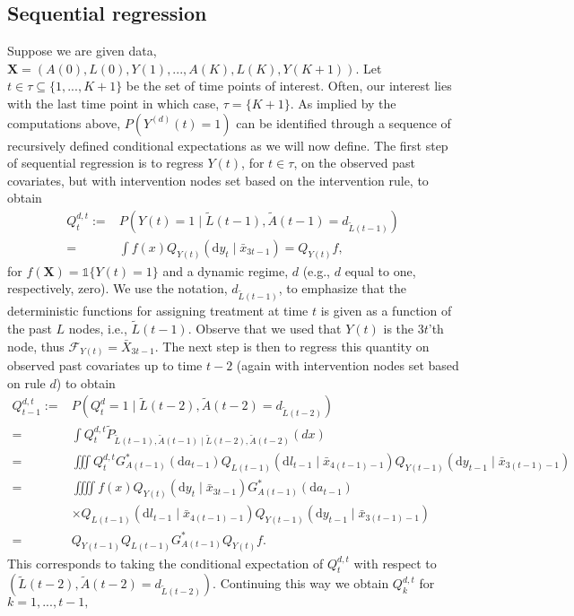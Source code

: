 \documentclass{article}
\newcommand{\A}[1]{A(#1)}
\renewcommand{\L}[1]{L(#1)}
\newcommand{\Y}[1]{Y(#1)}
\newcommand{\Ystar}[2]{Y^{(#1)}(#2)}
\newcommand{\Lbar}[1]{\tilde{L}(#1)}
\newcommand{\Abar}[1]{\tilde{A}(#1)}
\renewcommand{\d}{\ensuremath{\mathrm{d}}}
\begin{document}
    \subsection{Sequential regression}
    Suppose we are given data, $\textbf{X}=(\A{0},\L{0},\Y{1},...,\A{K},\L{K},\Y{K+1})$. Let $t\in\tau\subseteq\{1,...,K+1\}$ be the set of time points of interest. Often, our interest lies with the last time point in which case, $\tau=\{K+1\}$. As implied by the computations above, $P(\Ystar{d}{t}=1)$ can be identified through a sequence of recursively defined conditional expectations as we will now define. The first step of sequential regression is to regress $\Y{t}$, for $t\in\tau$, on the observed past covariates, but with intervention nodes set based on the intervention rule, to obtain 
    \begin{align*}
        Q_t^{d,t}:=&P(\Y{t}=1\mid \Lbar{t-1},\Abar{t-1}=d_{\Lbar{t-1}})\\
        =&\int f(x)Q_{\Y{t}}(\d y_t\mid \bar{x}_{3t-1})=Q_{\Y{t}}f,\tag{Step 1}
    \end{align*} 
    for $f(\textbf{X})=\mathds{1}\{\Y{t}=1\}$ and a \d ynamic regime, $d$ (e.g., $d$ equal to one, respectively, zero). We use the notation, $d_{\Lbar{t-1}}$, to emphasize that the deterministic functions for assigning treatment at time $t$ is given as a function of the past $L$ nodes, i.e., $\Lbar{t-1}$. Observe that we used that $Y(t)$ is the $3t$'th node, thus $\mathcal{F}_{\Y{t}}=\bar{X}_{3t-1}$. The next step is then to regress this quantity on observed past covariates up to time $t-2$ (again with intervention nodes set based on rule $d$) to obtain
    \begin{align*}
        Q_{t-1}^{d,t}:=&P(Q_{t}^d=1\mid \Lbar{t-2},\Abar{t-2}=d_{\Lbar{t-2}})\\
        =&\int Q_t^{d,t}\tilde{P}_{\Lbar{t-1},\Abar{t-1}\mid \Lbar{t-2},\Abar{t-2}}(dx)\\
        =&\iiint Q_t^{d,t}G^*_{\A{t-1}}(\d a_{t-1})Q_{\L{t-1}}(\d l_{t-1}\mid \bar{x}_{4(t-1)-1})Q_{\Y{t-1}}(\d y_{t-1}\mid \bar{x}_{3(t-1)-1})\\
        =&\iiiint f(x) Q_{\Y{t}}(\d y_t\mid \bar{x}_{3t-1})G^*_{\A{t-1}}(\d a_{t-1})\\
        &\times Q_{\L{t-1}}(\d l_{t-1}\mid \bar{x}_{4(t-1)-1})Q_{\Y{t-1}}(\d y_{t-1}\mid \bar{x}_{3(t-1)-1})\\
        =&Q_{\Y{t-1}}Q_{\L{t-1}}G^*_{\A{t-1}}Q_{\Y{t}}f.\tag{Step 2}
    \end{align*}
    This corresponds to taking the conditional expectation of $Q_t^{d,t}$ with respect to $(\Lbar{t-2},\Abar{t-2}=d_{\Lbar{t-2}})$. Continuing this way we obtain $Q_k^{d,t}$ for $k=1,...,t-1,$
\end{document}
